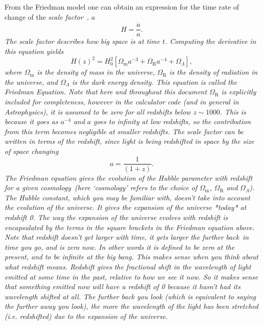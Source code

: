 \documentclass[]{article}
\begin{document}
\noindent From the Friedman model one can obtain an expression for the time rate of change of the \itshape scale factor~\upshape, $a$
\begin{equation}
H = \frac{\dot a}{a}.
\end{equation}
The scale factor describes how big space is at time $t$. Computing the derivative in this equation yields
\begin{equation}
H(z)^2 = H_0^2[\Omega_\mathrm{m} a^{-3}+\Omega_\mathrm{R} a^{-4}+\Omega_\Lambda],
\end{equation}
\noindent where $\Omega_\mathrm{m}$ is the density of mass in the universe, $\Omega_\mathrm{R}$ is the density of radiation in the universe, and $\Omega_\Lambda$ is the dark energy density. This equation is called the Friedman Equation. Note that here and throughout this document $\Omega_\mathrm{R}$ is explicitly included for completeness, however in the calculator code (and in general in Astrophysics), it is assumed to be zero for all redshifts below $z\sim1000$. This is because it goes as $a^{-4}$ and $a$ goes to infinity at low redshifts, so the contribution from this term becomes negligible at smaller redshifts. The scale factor can be written in terms of the redshift, since light is being redshifted in space by the size of space changing
\begin{equation}
a = \frac{1}{(1+z)}.
\end{equation}
The Friedman equation gives the evolution of the Hubble parameter with redshift for a given \itshape cosmology~\upshape (here ‘cosmology’ refers to the choice of $\Omega_\mathrm{m}$, $\Omega_\mathrm{R}$ and $\Omega_\Lambda$). The Hubble \itshape constant\upshape , which you may be familiar with, doesn't take into account the evolution of the universe. It gives the expansion of the universe *today* at redshift 0. The way the expansion of the universe evolves with redshift is encapsulated by the terms in the square brackets in the Friedman equation above. \\

\noindent Note that redshift doesn't get larger with time, it gets larger the further \itshape back~\upshape in time you go, and is zero now. In other words it is defined to be zero at the present, and to be infinite at the big bang. This makes sense when you think about what redshift means. Redshift gives the fractional shift in the wavelength of light emitted at some time in the past, relative to how we see it now. So it makes sense that something emitted now will have a redshift of 0 because it hasn't had its wavelength shifted at all. The further back you look (which is equivalent to saying the further away you look), the more the wavelength of the light has been stretched (i.e. redshifted) due to the expansion of the universe. \\
\end{document}
